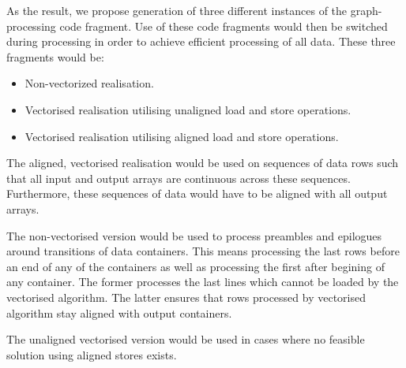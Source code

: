 As the result, we propose generation of three different instances of the graph-processing code fragment. Use of these code fragments would then be switched during processing in order to achieve efficient processing of all data. These three fragments would be:
\begin{itemize}
\item Non-vectorized realisation.
\item Vectorised realisation utilising unaligned load and store operations.
\item Vectorised realisation utilising aligned load and store operations.
\end{itemize}

The aligned, vectorised realisation would be used on sequences of data rows such that all input and output arrays are continuous across these sequences. Furthermore, these sequences of data would have to be aligned with all output arrays. 

The non-vectorised version would be used to process preambles and epilogues around transitions of data containers. This means processing the last  rows before an end of any of the containers as well as processing the first  after begining of any container. The former processes the last  lines which cannot be loaded by the vectorised algorithm. The latter ensures that rows processed by vectorised algorithm stay aligned with output containers.

The unaligned vectorised version would be used in cases where no feasible solution using aligned stores exists.



